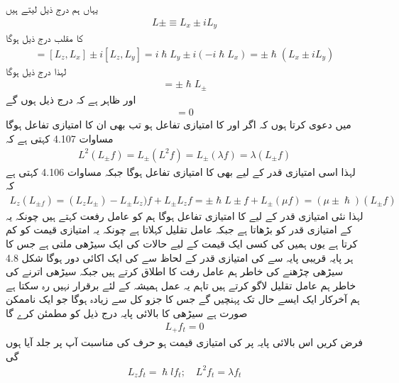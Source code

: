 یہاں ہم درج ذیل لیتے ہیں 
\begin{align}
L \pm \equiv L_x \pm i L_y
\end{align}
 کا مقلب درج ذیل ہوگا 
\begin{align*} 
[L_z, L_{\pm}] = [L_z, L_x] \pm i [L_z, L_y] = i \hslash L_y \pm i (- i \hslash L_x) = \pm \hslash (L_x \pm i L_y)
\end{align*}
لہذا درج ذیل ہوگا 
\begin{align}
[L_z, L_{\pm}] = \pm \hslash L_{\pm}
\end{align}
اور ظاہر ہے کہ درج ذیل ہوں گے 
\begin{align}
[L^2, L_{\pm}] = 0
\end{align}
میں دعوی کرتا ہوں کہ اگر  اور  کا امتیازی تفاعل  ہو تب  بھی ان کا امتیازی تفاعل ہوگا مساوات 4.107 کہتی ہے کہ 
\begin{align}
L^2 (L_{\pm} f) = L_{\pm} (L^2 f) = L_{\pm} (\lambda f) = \lambda (L_{\pm} f)
\end{align}
لہذا اسی امتیازی قدر  کے لیے  بھی  کا امتیازی تفاعل ہوگا جبکہ مساوات 4.106 کہتی ہے کہ 
\begin{align}
L_z (L_{\pm f}) = (L_z L_{\pm}) - L_{\pm} L_z) f + L_{\pm} L_z f = \pm \hslash L \pm f + L_{\pm} (\mu f) = (\mu \pm \hslash ) (L_{\pm} f)
\end{align}
لہذا نئی امتیازی قدر  کے لیے   کا امتیازی تفاعل ہوگا ہم  کو عامل رفعت کہتے ہیں چونکہ یہ  کے امتیازی قدر کو   بڑھاتا ہے جبکہ  عامل تقلیل کہلاتا ہے چونکہ یہ امتیازی قیمت کو  کم کرتا ہے یوں ہمیں  کی کسی ایک قیمت کے لیے حالات کی ایک سیڑھی ملتی ہے جس کا ہر پایہ قریبی پایہ سے  کی امتیازی قدر کے لحاظ سے  کی ایک اکائی دور ہوگا شکل 4.8 سیڑھی چڑھنے کی خاطر ہم عامل رفت کا اطلاق کرتے ہیں جبکہ سیڑھی اترنے کی خاطر ہم عامل تقلیل لاگو کرتے ہیں تاہم یہ عمل ہمیشہ کے لئے برقرار نہیں رہ سکتا ہے ہم آخرکار  ایک ایسے حال تک پہنچیں گے جس کا  جزو کل سے زیادہ ہوگا جو ایک ناممکن صورت ہے سیڑھی کا  بالائی   پایہ   درج ذیل کو مطمئن کرے گا
\begin{align}
L_{+} f_{t} = 0
\end{align}
فرض کریں اس بالائی پایہ پر  کی امتیازی قیمت  ہو حرف  کی مناسبت آپ پر جلد آیا ہوں گی 
\begin{align}
L_z f_t = \hslash l f_{t}; \quad L^2 f_t = \lambda f_t
\end{align}
